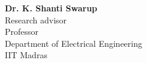 \vspace{-\parskip}
\begingroup
\singlespacing
\begin{flushright}
\textbf{Dr. K. Shanti Swarup}    \\
Research advisor        \\
Professor               \\
Department of Electrical Engineering  \\
IIT Madras              \\


\end{flushright}
\endgroup
\par
